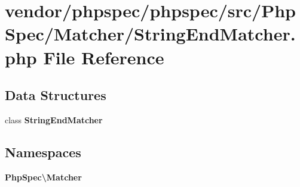 \section{vendor/phpspec/phpspec/src/\+Php\+Spec/\+Matcher/\+String\+End\+Matcher.php File Reference}
\label{_string_end_matcher_8php}
\subsection*{Data Structures}
\begin{DoxyCompactItemize}
\item 
class {\bf String\+End\+Matcher}
\end{DoxyCompactItemize}
\subsection*{Namespaces}
\begin{DoxyCompactItemize}
\item 
 {\bf Php\+Spec\textbackslash{}\+Matcher}
\end{DoxyCompactItemize}
